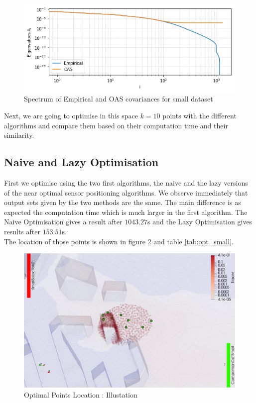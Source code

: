 \begin{figure}[h!]
\centering
	\includegraphics[width=0.7\linewidth]{figures/CompAlg/covarianceEmpOAS}
	\caption{Spectrum of Empirical and OAS covariances for small dataset}
	\label{fig:small_cov_eig}
\end{figure}

Next, we are going to optimise in this space $k=10$ points with the different algorithms and compare them based on their computation time and their similarity. 

\subsection{Naive and Lazy Optimisation}

First we optimise using the two first algorithms, the naive and the lazy versions of the near optimal sensor positioning algorithms. We observe immediately that output sets given by the two methods are the same. The main difference is as expected the computation time which is much larger in the first algorithm. The Naive Optimisation gives a result after $1043.27$s and the Lazy Optimisation gives results after $153.51 $s. \\

The location of those points is shown in figure \ref{fig:opt_small} and table \ref{tab:opt_small}.

\begin{figure}[h!]
\centering
	\includegraphics[width=0.8\linewidth]{figures/CompAlg/3rd/non_centered_60.35.0/optimal_screenshot}
	\caption{Optimal Points Location : Illustation}
	\label{fig:opt_small}
\end{figure}

